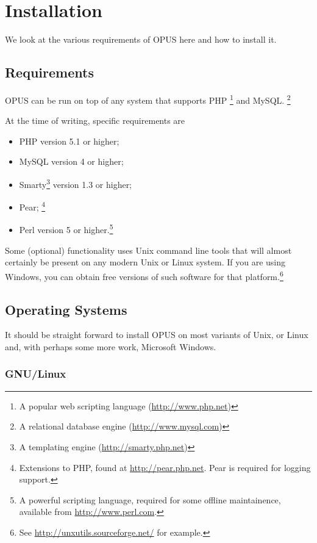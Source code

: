 \documentclass[12 pt]{book}
\begin{document}
\chapter{Installation}

We look at the various requirements of OPUS here and how to install it.

\section{Requirements}

OPUS can be run on top of  any system that supports PHP%
\footnote{A popular web scripting language (\url{http://www.php.net})} and MySQL.%
\footnote{A relational database engine (\url{http://www.mysql.com})}

At the time of writing, specific requirements are
\begin{itemize}
  \item PHP version 5.1 or higher;
  \item MySQL version 4 or higher;
  \item Smarty\footnote{A templating engine (\url{http://smarty.php.net})} version 1.3 or higher;
  \item Pear;%
    \footnote{Extensions to PHP, found at \url{http://pear.php.net}. Pear is required for logging support.}
  \item Perl version 5 or higher.\footnote{A powerful scripting language, required for some offline maintainence, available from \url{http://www.perl.com}.}
\end{itemize}

Some (optional) functionality uses Unix command line tools that will almost certainly be present on
any modern Unix or Linux system. If you are using Windows, you can obtain free versions of such
software for that platform.\footnote{See \url{http://unxutils.sourceforge.net/} for example.}

\section{Operating Systems}

It should be straight forward to install OPUS on most variants of Unix, or Linux and, with perhaps some more work, Microsoft Windows.

\subsection{GNU/Linux}
\end{document}
